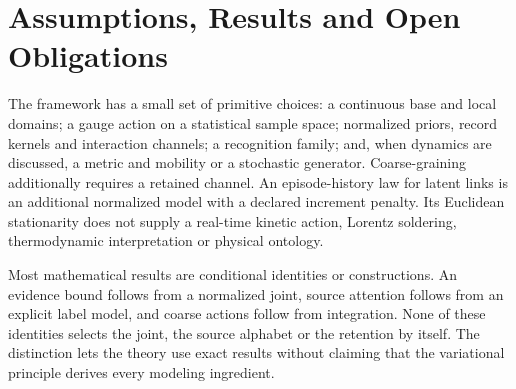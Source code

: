 \section{Assumptions, Results and Open Obligations}\label{sec:epistemic_status}

The framework has a small set of primitive choices: a continuous base and local domains; a gauge action on a statistical sample space; normalized priors, record kernels and interaction channels; a recognition family; and, when dynamics are discussed, a metric and mobility or a stochastic generator. Coarse-graining additionally requires a retained channel. An episode-history law for latent links is an additional normalized model with a declared increment penalty. Its Euclidean stationarity does not supply a real-time kinetic action, Lorentz soldering, thermodynamic interpretation or physical ontology.

Most mathematical results are conditional identities or constructions. An evidence bound follows from a normalized joint, source attention follows from an explicit label model, and coarse actions follow from integration. None of these identities selects the joint, the source alphabet or the retention by itself. The distinction lets the theory use exact results without claiming that the variational principle derives every modeling ingredient.

